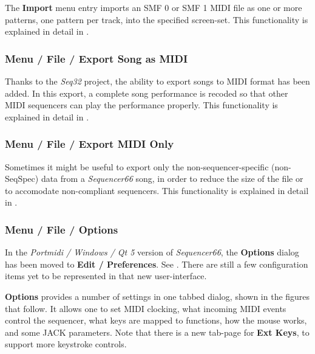    The \textbf{Import} menu entry imports an SMF 0
   or SMF 1 MIDI file as one or more patterns, one pattern per track,
   into the specified screen-set.
   This functionality is explained in detail in
   .

\subsubsection{Menu / File / Export Song as MIDI}
\label{subsubsec:seq66_menu_file_export}

   Thanks to the \textsl{Seq32} project, the ability to export songs to MIDI
   format has been added.  In this export, a complete song performance is
   recoded so that other MIDI sequencers can play the performance properly.
   This functionality is explained in detail in
   .

\subsubsection{Menu / File / Export MIDI Only}
\label{subsubsec:seq66_menu_file_export_midi_only}

   Sometimes it might be useful to export only the non-sequencer-specific
   (non-SeqSpec) data from a \textsl{Sequencer66} song, in order to reduce the
   size of the file or to accomodate non-compliant sequencers.
   This functionality is explained in detail in
   .

\subsubsection{Menu / File / Options}
\label{subsubsec:seq66_menu_file_options}

   In the \textsl{Portmidi / Windows / Qt 5} version of
   \textsl{Sequencer66}, the \textbf{Options} dialog has been moved to 
   \textbf{Edit / Preferences}.
   See .
   There are still a few configuration items yet to be represented in that
   new user-interface.

   \textbf{Options} provides a number of settings in one
   tabbed dialog, shown in the figures that follow.
   It allows one to set MIDI clocking,
   what incoming MIDI events control the sequencer, what keys are
   mapped to functions, how the mouse works, and some JACK parameters.
   Note that there is a new tab-page for \textbf{Ext Keys}, to support
   more keystroke controls.

